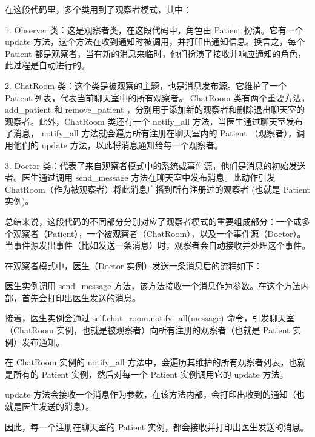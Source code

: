 \documentclass[24pt,a4paper]{article}%
\begin{document}
在这段代码里，多个类用到了观察者模式，其中：

1. Observer 类：这是观察者类，在这段代码中，角色由 Patient 扮演。它有一个 update 方法，这个方法在收到通知时被调用，并打印出通知信息。换言之，每个 Patient 都是观察者，当有新的消息来临时，他们扮演了接收并响应通知的角色，此过程是自动进行的。

2. ChatRoom 类：这个类是被观察的主题，也是消息发布源。它维护了一个 Patient 列表，代表当前聊天室中的所有观察者。 ChatRoom 类有两个重要方法，add\_patient 和 remove\_patient ，分别用于添加新的观察者和删除退出聊天室的观察者。此外，ChatRoom 类还有一个 notify\_all 方法，当医生通过聊天室发布了消息， notify\_all 方法就会遍历所有注册在聊天室内的 Patient （观察者），调用他们的 update 方法，以此将消息通知给每一个观察者。

3. Doctor 类：代表了来自观察者模式中的系统或事件源，他们是消息的初始发送者。医生通过调用 send\_message 方法在聊天室中发布消息。此动作引发 ChatRoom（作为被观察者）将此消息广播到所有注册过的观察者 (也就是 Patient 实例)。

总结来说，这段代码的不同部分分别对应了观察者模式的重要组成部分：一个或多个观察者（Patient），一个被观察者（ChatRoom），以及一个事件源（Doctor）。当事件源发出事件（比如发送一条消息）时，观察者会自动接收并处理这个事件。

在观察者模式中，医生（Doctor 实例）发送一条消息后的流程如下：

医生实例调用 send\_message 方法，该方法接收一个消息作为参数。在这个方法内部，首先会打印出医生发送的消息。

接着，医生实例会通过 self.chat\_room.notify\_all(message) 命令，引发聊天室（ChatRoom 实例，也就是被观察者）向所有注册的观察者（也就是 Patient 实例）发布通知。

在 ChatRoom 实例的 notify\_all 方法中，会遍历其维护的所有观察者列表，也就是所有的 Patient 实例，然后对每一个 Patient 实例调用它的 update 方法。

update 方法会接收一个消息作为参数，在该方法内部，会打印出收到的通知（也就是医生发送的消息）。

因此，每一个注册在聊天室的 Patient 实例，都会接收并打印出医生发送的消息。
\newpage
\end{document}
